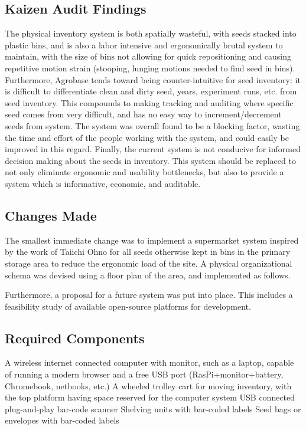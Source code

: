 \documentclass[12pt, letterpaper,oneocolumn]{article}
\begin{document}
	\subsection{Kaizen Audit Findings}
	The physical inventory system is both spatially wasteful, with seeds stacked into plastic bins, and is also a labor intensive and ergonomically brutal system to maintain, with the size of bins not allowing for quick repositioning and causing repetitive motion strain (stooping, lunging motions needed to find seed in bins). Furthermore, Agrobase tends toward being counter-intuitive for seed inventory: it is difficult to differentiate clean and dirty seed, years, experiment runs, etc. from seed inventory. This compounds to making tracking and auditing where specific seed comes from very difficult, and has no easy way to increment/decrement seeds from system. The system was overall found to be a blocking factor, wasting the time and effort of the people working with the system, and could easily be improved in this regard. Finally, the current system is not conducive for informed decision making about the seeds in inventory. This system should be replaced to not only eliminate ergonomic and usability bottlenecks, but also to provide a system which is informative, economic, and auditable.

	\subsection{Changes Made}
	The smallest immediate change was to implement a supermarket system inspired by the work of Taiichi Ohno \cite{ohno1988toyota} for all seeds otherwise kept in bins in the primary storage area to reduce the ergonomic load of the site. A physical organizational schema was devised using a floor plan of the area, and implemented as follows.

	Furthermore, a proposal for a future system was put into place. This includes a feasibility study of available open-source platforms for development.

	\subsection{Required Components}
		\begin{outline}[enumerate]
			\1 A wireless internet connected computer with monitor, such as a laptop, capable of running a modern browser and a free USB port (RasPi+monitor+battery, Chromebook, netbooks, etc.)
			\1 A wheeled trolley cart for moving inventory, with the top platform having space reserved for the computer system
			\1 USB connected plug-and-play bar-code scanner
		\1 Shelving units with bar-coded labels
		\1 Seed bags or envelopes with bar-coded labels
	\end{outline}
\end{document}
